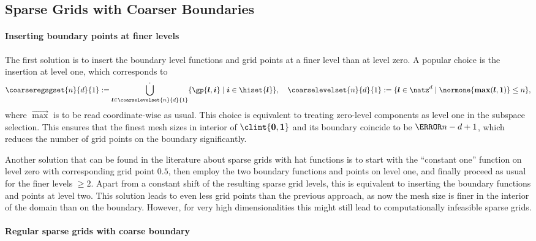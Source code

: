 \subsection{Sparse Grids with Coarser Boundaries}
\label{sec:241coarseBoundary}

\paragraph{Inserting boundary points at finer levels}

The first solution is to insert the boundary level functions and grid points
at a finer level than at level zero.
A popular choice is the insertion at level one, which corresponds to
\begin{equation}
  \label{eq:sparseGridB1}
  \coarseregsgset{n}{d}{1}
  := \bigdotcup_{\*l \in \coarselevelset{n}{d}{1}}
  \{\gp{\*l,\*i} \mid \*i \in \hiset{\*l}\},\quad
  \coarselevelset{n}{d}{1}
  := \{\*l \in \natz^d \mid \normone{\vecmax(\*l, \*1)} \le n\},
\end{equation}
where $\vec{\max}$ is to be read coordinate-wise as usual.
This choice is equivalent to treating zero-level components as level one
in the subspace selection.
This ensures that the finest mesh sizes in interior of $\clint{\*0, \*1}$ and
its boundary coincide to be $\ms{n-d+1}$, which reduces the number of grid points
on the boundary significantly.

Another solution that can be found in the literature about sparse grids with
hat functions \cite{Baar15Gradient}
is to start with the ``constant one'' function on level zero with
corresponding grid point $0.5$,
then employ the two boundary functions and points on level one,
and finally proceed as usual for the finer levels $\ge 2$.
Apart from a constant shift of the resulting sparse grid levels,
this is equivalent to inserting the boundary functions and points at level two.
This solution leads to even less grid points than the previous approach,
as now the mesh size is finer in the interior of the domain than on the
boundary.
However, for very high dimensionalities this might still lead to
computationally infeasible sparse grids.

\paragraph{Regular sparse grids with coarse boundary}

